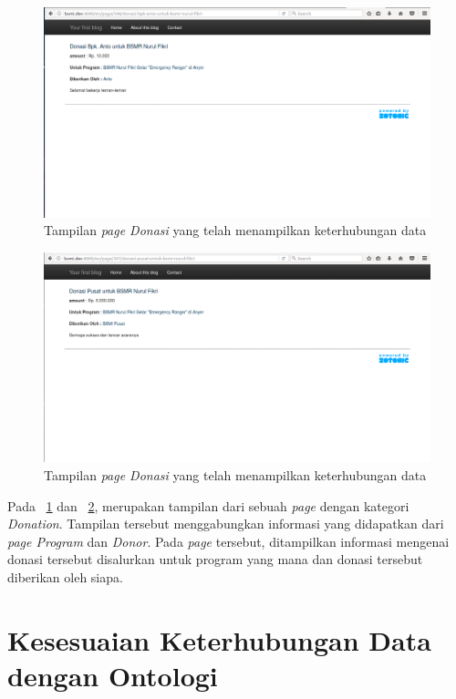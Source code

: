\begin{figure}
	\centering
	\includegraphics[width=1\textwidth]
	{pics/101-donasi.png}
	\caption{Tampilan \textit{page Donasi} yang telah menampilkan keterhubungan data}
	\label{fig:donationlinked}
\end{figure}
\vspace{-0.3cm}

\begin{figure}
	\centering
	\includegraphics[width=1\textwidth]
	{pics/101-donasi2.png}
	\caption{Tampilan \textit{page Donasi} yang telah menampilkan keterhubungan data}
	\label{fig:donationlinked2}
\end{figure}
\vspace{-0.3cm}

Pada \pic~\ref{fig:donationlinked} dan \pic~\ref{fig:donationlinked2}, merupakan tampilan dari sebuah \textit{page} dengan kategori \textit{Donation}. Tampilan tersebut menggabungkan informasi yang didapatkan dari \textit{page Program} dan \textit{Donor}. Pada \textit{page} tersebut, ditampilkan informasi mengenai donasi tersebut disalurkan untuk program yang mana dan donasi tersebut diberikan oleh siapa.

\section{Kesesuaian Keterhubungan Data dengan Ontologi}

